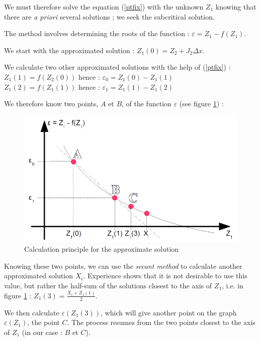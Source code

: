 We must therefore solve the equation (\ref{ptfix}) with the unknown $Z_1$ knowing that there are \textit{a priori} several solutions ; we seek the subcritical solution.

The method involves determining the roots of the function : $\varepsilon = Z_1 - f(Z_1)$.

We start with the approximated solution : $Z_1(0) = Z_2 + J_2 \Delta x$.

We calculate two other approximated solutions with the help of (\ref{ptfix}) : \\
$Z_1(1) = f(Z_2(0))$ hence : $\varepsilon_0 = Z_1(0) - Z_1(1)$ \\
$Z_1(2) = f(Z_1(1))$ hence : $\varepsilon_1 = Z_1(1) - Z_1(2)$

We therefore know two points, $A$ et $B$, of the function $\varepsilon$ (see figure \ref{fig:calsolapproc}) :

\begin{figure}[H]
 \begin{center}
  \includegraphics[width=\textwidth]{Figures/Princ_Cal_Sol_Apr.png}
  \caption{Calculation principle for the approximate solution}
  \label{fig:calsolapproc}
 \end{center}
\end{figure}

Knowing these two points, we can use the \textit{secant method} to calculate another approximated solution $X_i$. Experience shows that it is not desirable to use this value, but rather the half-sum of the solutions closest to the axis of $Z_1$, i.e. in figure \ref{fig:calsolapproc} : $Z_{1}(3) = \frac{X_i + Z_{1}(1)}{2}$.

We then calculate $\varepsilon(Z_{1}(3))$, which will give another point on the graph $\varepsilon(Z_1)$, the point $C$. The process resumes from the two points closest to the axis of $Z_1$ (in our case : $B$ et $C$).


